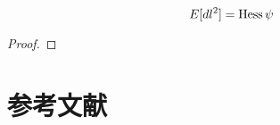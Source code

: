 \documentclass[report]{jlreq}
\begin{document}
\begin{proposition}
    \begin{equation}
        E[dl^2] = \operatorname{Hess}\psi
    \end{equation}
\end{proposition}

\begin{proof}
    \TODO{}
\end{proof}



%
\section*{参考文献}

\nocite{amari_information_2016}

{
    \renewcommand{\bibsection}{}
    
    
}
\end{document}
